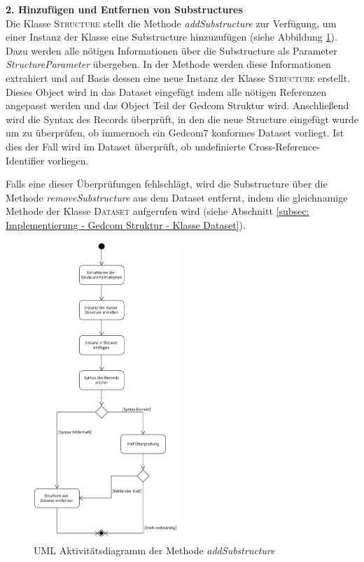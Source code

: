 \vspace{1em}
\textbf{2. Hinzufügen und Entfernen von Substructures} \vspace{0.5em} \\
Die Klasse \textsc{Structure} stellt die Methode \textit{addSubstructure} zur Verfügung, um einer Instanz der Klasse eine Substructure hinzuzufügen (siehe Abbildung \ref{fig: UML Aktivität addSubstructure}). Dazu werden alle nötigen Informationen über die Substructure als Parameter \textit{StructureParameter} übergeben. In der Methode werden diese Informationen extrahiert und auf Basis dessen eine neue Instanz der Klasse \textsc{Structure} erstellt. Dieses Object wird in das Dataset eingefügt indem alle nötigen Referenzen angepasst werden und das Object Teil der Gedcom Struktur wird. Anschließend wird die Syntax des Records überprüft, in den die neue Structure eingefügt wurde um zu überprüfen, ob immernoch ein Gedcom7 konformes Dataset vorliegt. Ist dies der Fall wird im Dataset überprüft, ob undefinierte Cross-Reference-Identifier vorliegen. 


Falls eine dieser Überprüfungen fehlschlägt, wird die Substructure über die Methode \textit{removeSubstructure} aus dem Dataset entfernt, indem die gleichnamige Methode der Klasse \textsc{Dataset} aufgerufen wird (siehe Abschnitt \ref{subsec: Implementierung - Gedcom Struktur - Klasse Dataset}).
\begin{figure}[h]
	\centering
	\includegraphics[width=0.5\textwidth]{images/UML_Activity_AddSubstruct.png}
	\caption{UML Aktivitätsdiagramm der Methode \textit{addSubstructure}}
	\label{fig: UML Aktivität addSubstructure}
\end{figure}

